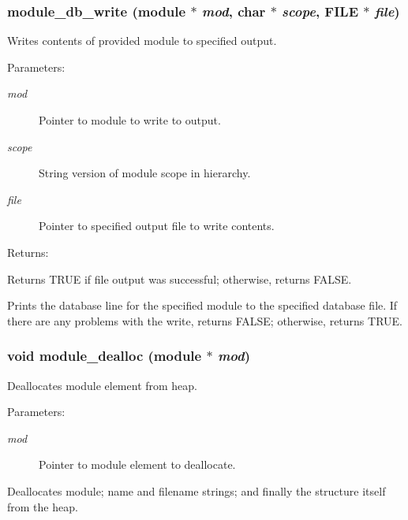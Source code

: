 \subsubsection{ module\_\-db\_\-write ({\bf module} $\ast$ {\em mod}, char $\ast$ {\em scope}, FILE $\ast$ {\em file})}\label{module_8h_a2}


Writes contents of provided module to specified output.

\begin{Desc}
\item[Parameters: ]\par
\begin{description}
\item[{\em 
mod}]Pointer to module to write to output. \item[{\em 
scope}]String version of module scope in hierarchy. \item[{\em 
file}]Pointer to specified output file to write contents. \end{description}
\end{Desc}
\begin{Desc}
\item[Returns: ]\par
Returns TRUE if file output was successful; otherwise, returns FALSE.\end{Desc}
Prints the database line for the specified module to the specified database file. If there are any problems with the write, returns FALSE; otherwise, returns TRUE. 
\subsubsection{\setlength{\rightskip}{0pt plus 5cm}void module\_\-dealloc ({\bf module} $\ast$ {\em mod})}\label{module_8h_a8}


Deallocates module element from heap.

\begin{Desc}
\item[Parameters: ]\par
\begin{description}
\item[{\em 
mod}]Pointer to module element to deallocate.\end{description}
\end{Desc}
Deallocates module; name and filename strings; and finally the structure itself from the heap. 
